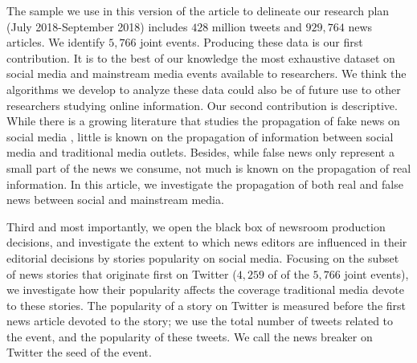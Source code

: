 The sample we use in this version of the article to delineate our research plan (July 2018-September 2018) includes $428$ million tweets and $929,764$ news articles. We identify $5,766$ joint events. Producing these data is our first contribution. It is to the best of our knowledge the most exhaustive dataset on social media and mainstream media events available to researchers. We think the algorithms we develop to analyze these data could also be of future use to other researchers studying online information. Our second contribution is descriptive. While there is a growing literature that studies the propagation of fake news on social media \citep{Vosoughietal2017,VosoughiRoyAral2018}, little is known on the propagation of information between social media and traditional media outlets. Besides, while false news only represent a small part of the news we consume, not much is known on the propagation of real information. In this article, we investigate the propagation of both real and false news between social and mainstream media.

Third and most importantly, we open the black box of newsroom production decisions, and investigate the extent to which news editors are influenced in their editorial decisions by stories popularity on social media. Focusing on the subset of news stories that originate first on Twitter ($4,259$ of of the $5,766$ joint events), we investigate how their popularity affects the coverage traditional media devote to these stories. The popularity of a story on Twitter is measured before the first news article devoted to the story; we use the total number of tweets related to the event, and the popularity of these tweets. We call the news breaker on Twitter the seed of the event.

